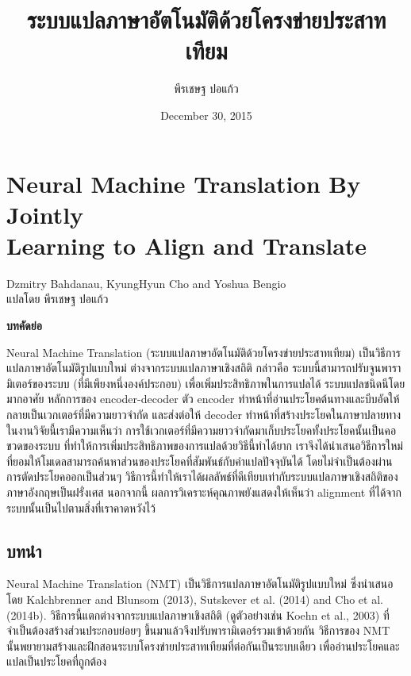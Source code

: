 \documentclass[17pt,fancychapters]{report}
\title{ระบบแปลภาษาอัตโนมัติด้วยโครงข่ายประสาทเทียม}
\author{พีรเชษฐ  ปอแก้ว}
\date{December 30, 2015}
\begin{document}
\maketitle
{}
\newpage
{}
\tableofcontents
\newpage
{}

\chapter[Neural Machine Translation By Jointly Learning to Align and Translate]{Neural Machine Translation By Jointly \\ Learning to Align and Translate}



\begin{flushright}
  Dzmitry Bahdanau, KyungHyun Cho and Yoshua Bengio \\
  {\small แปลโดย พีรเชษฐ ปอแก้ว}
\end{flushright}

\textbf{บทคัดย่อ}

Neural Machine Translation (ระบบแปลภาษาอัตโนมัติด้วยโครงข่ายประสาทเทียม) เป็นวิธีการแปลภาษาอัตโนมัติรูปแบบใหม่ ต่างจากระบบแปลภาษาเชิงสถิติ กล่าวคือ ระบบนี้สามารถปรับจูนพารามิเตอร์ของระบบ (ที่มีเพียงหนึ่งองค์ประกอบ) เพื่อเพิ่มประสิทธิภาพในการแปลได้ ระบบแปลชนิดนีโดยมากอาศัย หลักการของ encoder-decoder ตัว encoder ทำหน้าที่อ่านประโยคต้นทางและบีบอัดให้กลายเป็นเวกเตอร์ที่มีความยาวจำกัด และส่งต่อให้ decoder ทำหน้าที่สร้างประโยคในภาษาปลายทาง ในงานวิจัยนี้เรามีความเห็นว่า การใช้เวกเตอร์ที่มีความยาวจำกัดมาเก็บประโยคทั้งประโยคนั้นเป็นคอขวดของระบบ ที่ทำให้การเพิ่มประสิทธิภาพของการแปลด้วยวิธีนี้ทำได้ยาก เราจึงได้นำเสนอวิธีการใหม่ที่ยอมให้โมเดลสามารถค้นหาส่วนของประโยคที่สัมพันธ์กับคำแปลปัจจุบันได้ โดยไม่จำเป็นต้องผ่านการตัดประโยคออกเป็นส่วนๆ วิธีการนี้ทำให้เราได้ผลลัพธ์ที่ดีเทียบเท่ากับระบบแปลภาษาเชิงสถิติของภาษาอังกฤษเป็นฝรั่งเศส นอกจากนี้ ผลการวิเคราะห์คุณภาพยังแสดงให้เห็นว่า alignment ที่ได้จากระบบนั้นเป็นไปตามสิ่งที่เราคาดหวังไว้ 


\section{บทนำ}
Neural Machine Translation (NMT) เป็นวิธีการแปลภาษาอัตโนมัติรูปแบบใหม่ ซึ่งนำเสนอโดย Kalchbrenner and Blunsom (2013), Sutskever et al. (2014) and Cho et al. (2014b). วิธีการนี้แตกต่างจากระบบแปลภาษาเชิงสถิติ (ดูตัวอย่างเช่น Koehn et al., 2003) ที่จำเป็นต้องสร้างส่วนประกอบย่อยๆ ขึ้นมาแล้วจึงปรับพารามิเตอร์รวมเข้าด้วยกัน วิธีการของ NMT นั้นพยายามสร้างและฝึกสอนระบบโครงข่ายประสาทเทียมที่ต่อกันเป็นระบบเดียว เพื่ออ่านประโยคและแปลเป็นประโยคที่ถูกต้อง
\end{document}
